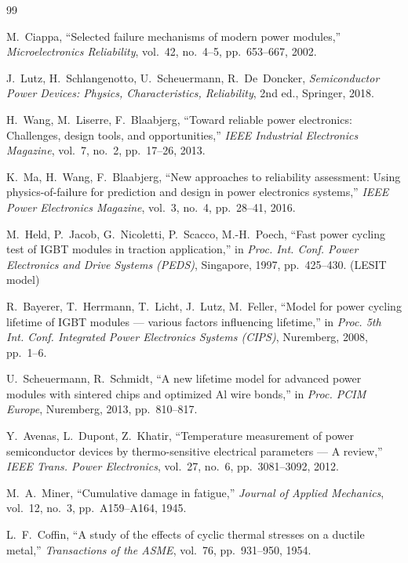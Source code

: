 \documentclass[11pt,a4paper]{article}
\begin{document}
\begin{thebibliography}{99}

M.~Ciappa,
``Selected failure mechanisms of modern power modules,''
\emph{Microelectronics Reliability}, vol.~42, no.~4--5, pp.~653--667, 2002.

J.~Lutz, H.~Schlangenotto, U.~Scheuermann, R.~De~Doncker,
\emph{Semiconductor Power Devices: Physics, Characteristics, Reliability},
2nd ed., Springer, 2018.

H.~Wang, M.~Liserre, F.~Blaabjerg,
``Toward reliable power electronics: Challenges, design tools, and
opportunities,''
\emph{IEEE Industrial Electronics Magazine}, vol.~7, no.~2, pp.~17--26, 2013.

K.~Ma, H.~Wang, F.~Blaabjerg,
``New approaches to reliability assessment: Using physics-of-failure for
prediction and design in power electronics systems,''
\emph{IEEE Power Electronics Magazine}, vol.~3, no.~4, pp.~28--41, 2016.

M.~Held, P.~Jacob, G.~Nicoletti, P.~Scacco, M.-H.~Poech,
``Fast power cycling test of IGBT modules in traction application,''
in \emph{Proc. Int. Conf. Power Electronics and Drive Systems (PEDS)},
Singapore, 1997, pp.~425--430. (LESIT model)

R.~Bayerer, T.~Herrmann, T.~Licht, J.~Lutz, M.~Feller,
``Model for power cycling lifetime of IGBT modules --- various factors
influencing lifetime,''
in \emph{Proc. 5th Int. Conf. Integrated Power Electronics Systems (CIPS)},
Nuremberg, 2008, pp.~1--6.

U.~Scheuermann, R.~Schmidt,
``A new lifetime model for advanced power modules with sintered chips and
optimized Al wire bonds,''
in \emph{Proc. PCIM Europe}, Nuremberg, 2013, pp.~810--817.

Y.~Avenas, L.~Dupont, Z.~Khatir,
``Temperature measurement of power semiconductor devices by thermo-sensitive
electrical parameters --- A review,''
\emph{IEEE Trans. Power Electronics}, vol.~27, no.~6, pp.~3081--3092, 2012.

M.~A.~Miner,
``Cumulative damage in fatigue,''
\emph{Journal of Applied Mechanics}, vol.~12, no.~3, pp.~A159--A164, 1945.

L.~F.~Coffin,
``A study of the effects of cyclic thermal stresses on a ductile metal,''
\emph{Transactions of the ASME}, vol.~76, pp.~931--950, 1954.


\end{thebibliography}
\end{document}
